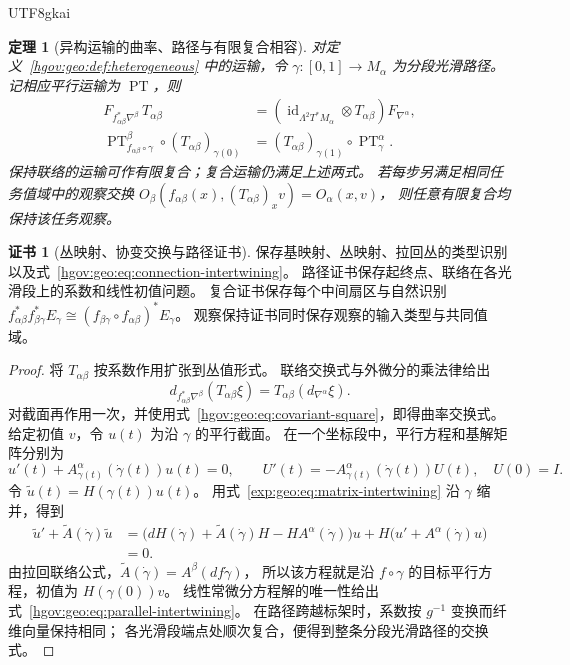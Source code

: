 \documentclass[12pt,a4paper,openany,notitlepage]{report}
\theoremstyle{plain}
\newtheorem{theorem}{定理}[chapter]
\theoremstyle{definition}
\newtheorem*{certificate}{证书}
\theoremstyle{remark}
\def\mathcal#1{#1}\def\mathsf#1{#1}\def\mathbb#1{#1}%
\begin{document}
\begin{CJK*}{UTF8}{gkai}
\begin{theorem}[异构运输的曲率、路径与有限复合相容]
\label{hgov:geo:thm:transport}
对定义~\ref{hgov:geo:def:heterogeneous} 中的运输，令 $\gamma:[0,1]\to M_\alpha$ 为分段光滑路径。
记相应平行运输为 $\operatorname{PT}$，则
\begin{align}
\label{hgov:geo:eq:curvature-intertwining}
F_{f_{\alpha\beta}^*\nabla^\beta}\,T_{\alpha\beta}
&=(\operatorname{id}_{\Lambda^2T^*M_\alpha}\otimes T_{\alpha\beta})F_{\nabla^\alpha},\\
\label{hgov:geo:eq:parallel-intertwining}
\operatorname{PT}^{\beta}_{f_{\alpha\beta}\circ\gamma}
\circ(T_{\alpha\beta})_{\gamma(0)}
&=(T_{\alpha\beta})_{\gamma(1)}
\circ\operatorname{PT}^{\alpha}_{\gamma}.
\end{align}
保持联络的运输可作有限复合；复合运输仍满足上述两式。
若每步另满足相同任务值域中的观察交换
$\mathcal O_\beta(f_{\alpha\beta}(x),(T_{\alpha\beta})_xv)=\mathcal O_\alpha(x,v)$，
则任意有限复合均保持该任务观察。
\end{theorem}

\begin{certificate}[丛映射、协变交换与路径证书]
保存基映射、丛映射、拉回丛的类型识别以及式~\eqref{hgov:geo:eq:connection-intertwining}。
路径证书保存起终点、联络在各光滑段上的系数和线性初值问题。
复合证书保存每个中间扇区与自然识别
$f_{\alpha\beta}^*f_{\beta\gamma}^*E_\gamma
\cong(f_{\beta\gamma}\circ f_{\alpha\beta})^*E_\gamma$。
观察保持证书同时保存观察的输入类型与共同值域。
\end{certificate}

\begin{proof}
将 $T_{\alpha\beta}$ 按系数作用扩张到丛值形式。
联络交换式与外微分的乘法律给出
\[
d_{f_{\alpha\beta}^*\nabla^\beta}(T_{\alpha\beta}\xi)
=T_{\alpha\beta}(d_{\nabla^\alpha}\xi).
\]
对截面再作用一次，并使用式~\eqref{hgov:geo:eq:covariant-square}，即得曲率交换式。
给定初值 $v$，令 $u(t)$ 为沿 $\gamma$ 的平行截面。
在一个坐标段中，平行方程和基解矩阵分别为
\[
u'(t)+A^\alpha_{\gamma(t)}(\dot\gamma(t))u(t)=0,
\qquad
U'(t)=-A^\alpha_{\gamma(t)}(\dot\gamma(t))U(t),\quad U(0)=I.
\]
令 $\widetilde u(t)=H(\gamma(t))u(t)$。
用式~\eqref{exp:geo:eq:matrix-intertwining} 沿 $\gamma$ 缩并，得到
\[
\begin{aligned}
\widetilde u'+\widetilde A(\dot\gamma)\widetilde u
&=\bigl(dH(\dot\gamma)+\widetilde A(\dot\gamma)H
       -HA^\alpha(\dot\gamma)\bigr)u
 +H\bigl(u'+A^\alpha(\dot\gamma)u\bigr)\\
&=0.
\end{aligned}
\]
由拉回联络公式，$\widetilde A(\dot\gamma)=A^\beta(df\dot\gamma)$，
所以该方程就是沿 $f\circ\gamma$ 的目标平行方程，初值为 $H(\gamma(0))v$。
线性常微分方程解的唯一性给出式~\eqref{hgov:geo:eq:parallel-intertwining}。
在路径跨越标架时，系数按 $g^{-1}$ 变换而纤维向量保持相同；
各光滑段端点处顺次复合，便得到整条分段光滑路径的交换式。


\end{proof}
\end{CJK*}
\end{document}
